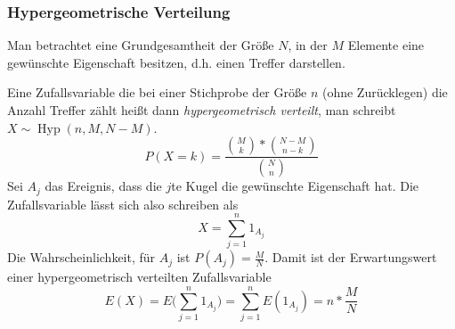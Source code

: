 \subsubsection{Hypergeometrische Verteilung}
Man betrachtet eine Grundgesamtheit der Größe $N$, in der $M$ Elemente eine gewünschte Eigenschaft besitzen, d.h. einen Treffer darstellen. 

Eine Zufallsvariable die bei einer Stichprobe der Größe $n$ (ohne Zurücklegen) die Anzahl Treffer zählt heißt dann \emph{hypergeometrisch verteilt}, man schreibt $X\sim \operatorname{Hyp}(n,M,N-M)$.
\begin{equation*}
 	P(X=k)=\frac{\binom Mk*\binom{N-M}{n-k}}{\binom Nn}
\end{equation*}
Sei $A_j$ das Ereignis, dass die $j$te Kugel die gewünschte Eigenschaft hat.
Die Zufallsvariable lässt sich also schreiben als
\begin{equation*}
	X=\sum_{j=1}^n 1_{A_j}
\end{equation*}
Die Wahrscheinlichkeit, für $A_j$ ist $P(A_j)=\frac MN$. Damit ist der Erwartungswert einer hypergeometrisch verteilten Zufallsvariable
\begin{equation*}
	E(X)=E\Big(\sum_{j=1}^n 1_{A_j} \Big)=\sum_{j=1}^n E(1_{A_j})=n*\frac MN
\end{equation*}

